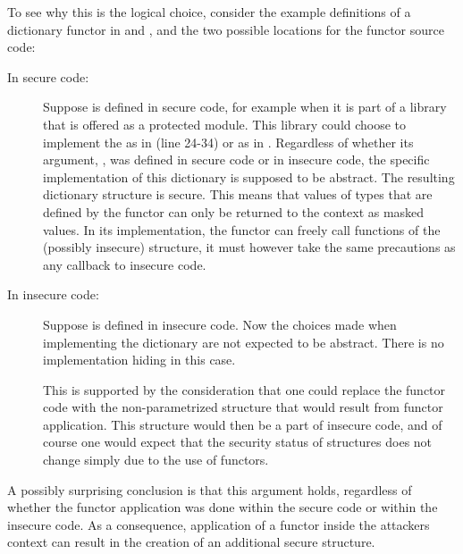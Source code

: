To see why this is the logical choice, consider the example definitions of a dictionary functor in  and , and the two possible locations for the functor source code:
\begin{description}
\item[In secure code:] 
Suppose  is defined in secure code, for example when it is part of a library that is offered as a protected module.
This library could choose to implement the  as in  (line 24-34) or as in .
Regardless of whether its argument, , was defined in secure code or in insecure code, the specific implementation of this dictionary is supposed to be abstract.
The resulting dictionary structure is secure.
This means that values of types that are defined by the functor can only be returned to the context as masked values.
In its implementation, the functor can freely call functions of the (possibly insecure) structure, it must however take the same precautions as any callback to insecure code.
\item[In insecure code:] Suppose  is defined in insecure code.
Now the choices made when implementing the dictionary are not expected to be abstract. There is no implementation hiding in this case.

This is supported by the consideration that one could replace the functor code with the non-parametrized structure that would result from functor application.
This structure would then be a part of insecure code, and of course one would expect that the security status of structures does not change simply due to the use of functors.
\end{description}

A possibly surprising conclusion is that this argument holds, regardless of whether the functor application was done within the secure code or within the insecure code.
As a consequence, application of a functor inside the attackers context can result in the creation of an additional secure structure.

